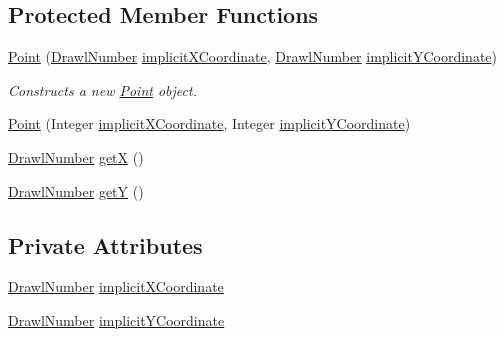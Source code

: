 \subsection*{Protected Member Functions}
\begin{DoxyCompactItemize}
\item 
\hyperlink{classcom_1_1aarrelaakso_1_1drawl_1_1_point_a934b3150ce40f5da49f10ed45a957e32}{Point} (\hyperlink{classcom_1_1aarrelaakso_1_1drawl_1_1_drawl_number}{Drawl\+Number} \hyperlink{classcom_1_1aarrelaakso_1_1drawl_1_1_point_ac6643d28a97dd4db5803239cf6652eda}{implicit\+X\+Coordinate}, \hyperlink{classcom_1_1aarrelaakso_1_1drawl_1_1_drawl_number}{Drawl\+Number} \hyperlink{classcom_1_1aarrelaakso_1_1drawl_1_1_point_a524e26eff45b9030d754788ed86f7ac2}{implicit\+Y\+Coordinate})
\begin{DoxyCompactList}\small\item\em Constructs a new \hyperlink{classcom_1_1aarrelaakso_1_1drawl_1_1_point}{Point} object. \end{DoxyCompactList}\item 
\hyperlink{classcom_1_1aarrelaakso_1_1drawl_1_1_point_a7dafad597a0de883a2168702294ac42c}{Point} (Integer \hyperlink{classcom_1_1aarrelaakso_1_1drawl_1_1_point_ac6643d28a97dd4db5803239cf6652eda}{implicit\+X\+Coordinate}, Integer \hyperlink{classcom_1_1aarrelaakso_1_1drawl_1_1_point_a524e26eff45b9030d754788ed86f7ac2}{implicit\+Y\+Coordinate})
\item 
\hyperlink{classcom_1_1aarrelaakso_1_1drawl_1_1_drawl_number}{Drawl\+Number} \hyperlink{classcom_1_1aarrelaakso_1_1drawl_1_1_point_a69062d6a80ab951e2687e31d2b3f99ee}{getX} ()
\item 
\hyperlink{classcom_1_1aarrelaakso_1_1drawl_1_1_drawl_number}{Drawl\+Number} \hyperlink{classcom_1_1aarrelaakso_1_1drawl_1_1_point_a9b4a6a3de7c80227d5d318dc9afb4edd}{getY} ()
\end{DoxyCompactItemize}
\subsection*{Private Attributes}
\begin{DoxyCompactItemize}
\item 
\hyperlink{classcom_1_1aarrelaakso_1_1drawl_1_1_drawl_number}{Drawl\+Number} \hyperlink{classcom_1_1aarrelaakso_1_1drawl_1_1_point_ac6643d28a97dd4db5803239cf6652eda}{implicit\+X\+Coordinate}
\item 
\hyperlink{classcom_1_1aarrelaakso_1_1drawl_1_1_drawl_number}{Drawl\+Number} \hyperlink{classcom_1_1aarrelaakso_1_1drawl_1_1_point_a524e26eff45b9030d754788ed86f7ac2}{implicit\+Y\+Coordinate}
\end{DoxyCompactItemize}


